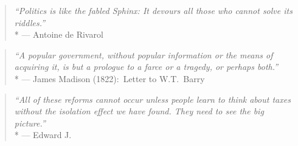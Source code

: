 

\begin{quote}
	\emph{``Politics is like the fabled Sphinx:
	It devours all those who cannot solve its riddles.''}
	\\*
	--- Antoine de Rivarol
\end{quote}

\begin{quote}
	\emph{``A popular government, without popular information or the means of acquiring it, is but a prologue to a farce or a tragedy, or perhaps both.''}
	\\*
	--- James Madison (1822):\ Letter to W.T.~Barry
\end{quote}

\begin{quote}
	\emph{``All of these reforms cannot occur unless people learn to think about taxes without the isolation effect we have found.
	They need to see the big picture.''}
	\\*
	--- Edward J.~\citet[23]{McCaffery2003}
\end{quote}







